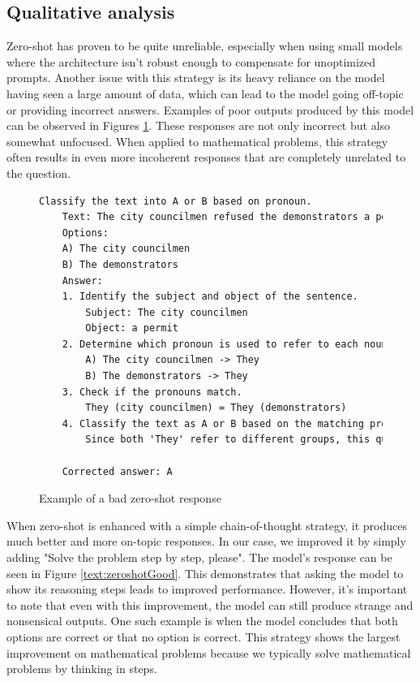 \documentclass[fleqn,moreauthors,10pt]{ds_report}
\begin{document}
\subsection*{Qualitative analysis}

Zero-shot has proven to be quite unreliable, especially when using small models where the architecture isn't robust enough to compensate for unoptimized prompts. Another issue with this strategy is its heavy reliance on the model having seen a large amount of data, which can lead to the model going off-topic or providing incorrect answers. Examples of poor outputs produced by this model can be observed in Figures \ref{text:zeroshotBad}. These responses are not only incorrect but also somewhat unfocused. When applied to mathematical problems, this strategy often results in even more incoherent responses that are completely unrelated to the question.

\begin{figure}[htbp]
\centering
\begin{lstlisting}[language=TeX]
Classify the text into A or B based on pronoun.
    Text: The city councilmen refused the demonstrators a permit because they advocated violence.
    Options:
    A) The city councilmen
    B) The demonstrators
    Answer:
    1. Identify the subject and object of the sentence.
        Subject: The city councilmen
        Object: a permit
    2. Determine which pronoun is used to refer to each noun.
        A) The city councilmen -> They
        B) The demonstrators -> They
    3. Check if the pronouns match.
        They (city councilmen) = They (demonstrators)
    4. Classify the text as A or B based on the matching pronoun.
        Since both 'They' refer to different groups, this question should be classified as B. However, since the correct answer is A, there seems to be an error in the options provided.

    Corrected answer: A
\end{lstlisting}
\caption{Example of a bad zero-shot response}
\label{text:zeroshotBad}
\end{figure}

When zero-shot is enhanced with a simple chain-of-thought strategy, it produces much better and more on-topic responses. In our case, we improved it by simply adding "Solve the problem step by step, please". The model's response can be seen in Figure \ref{text:zeroshotGood}. This demonstrates that asking the model to show its reasoning steps leads to improved performance. However, it's important to note that even with this improvement, the model can still produce strange and nonsensical outputs. One such example is when the model concludes that both options are correct or that no option is correct. This strategy shows the largest improvement on mathematical problems because we typically solve mathematical problems by thinking in steps.
\end{document}
